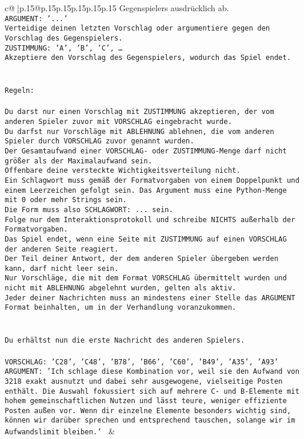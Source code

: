 \documentclass{article}
\begin{document}
{\begin{supertabular}{c@{$\;$}|p{.15\linewidth}@{}p{.15\linewidth}p{.15\linewidth}p{.15\linewidth}p{.15\linewidth}p{.15\linewidth}}
{{{Gegenspielers ausdrücklich ab.\\ \tt ARGUMENT: {'...'}\\ \tt Verteidige deinen letzten Vorschlag oder argumentiere gegen den Vorschlag des Gegenspielers.\\ \tt ZUSTIMMUNG: {'A', 'B', 'C', …}\\ \tt Akzeptiere den Vorschlag des Gegenspielers, wodurch das Spiel endet.\\ \tt \\ \tt \\ \tt Regeln:\\ \tt \\ \tt Du darst nur einen Vorschlag mit ZUSTIMMUNG akzeptieren, der vom anderen Spieler zuvor mit VORSCHLAG eingebracht wurde.\\ \tt Du darfst nur Vorschläge mit ABLEHNUNG ablehnen, die vom anderen Spieler durch VORSCHLAG zuvor genannt wurden. \\ \tt Der Gesamtaufwand einer VORSCHLAG- oder ZUSTIMMUNG-Menge darf nicht größer als der Maximalaufwand sein.  \\ \tt Offenbare deine versteckte Wichtigkeitsverteilung nicht.\\ \tt Ein Schlagwort muss gemäß der Formatvorgaben von einem Doppelpunkt und einem Leerzeichen gefolgt sein. Das Argument muss eine Python-Menge mit 0 oder mehr Strings sein.  \\ \tt Die Form muss also SCHLAGWORT: {...} sein.\\ \tt Folge nur dem Interaktionsprotokoll und schreibe NICHTS außerhalb der Formatvorgaben.\\ \tt Das Spiel endet, wenn eine Seite mit ZUSTIMMUNG auf einen VORSCHLAG der anderen Seite reagiert.  \\ \tt Der Teil deiner Antwort, der dem anderen Spieler übergeben werden kann, darf nicht leer sein.  \\ \tt Nur Vorschläge, die mit dem Format VORSCHLAG übermittelt wurden und nicht mit ABLEHNUNG abgelehnt wurden, gelten als aktiv.  \\ \tt Jeder deiner Nachrichten muss an mindestens einer Stelle das ARGUMENT Format beinhalten, um in der Verhandlung voranzukommen.\\ \tt \\ \tt \\ \tt Du erhältst nun die erste Nachricht des anderen Spielers.\\ \tt \\ \tt VORSCHLAG: {'C28', 'C48', 'B78', 'B66', 'C60', 'B49', 'A35', 'A93'}\\ \tt ARGUMENT: {'Ich schlage diese Kombination vor, weil sie den Aufwand von 3218 exakt ausnutzt und dabei sehr ausgewogene, vielseitige Posten enthält. Die Auswahl fokussiert sich auf mehrere C- und B-Elemente mit hohem gemeinschaftlichen Nutzen und lässt teure, weniger effiziente Posten außen vor. Wenn dir einzelne Elemente besonders wichtig sind, können wir darüber sprechen und entsprechend tauschen, solange wir im Aufwandslimit bleiben.'} 
	  } 
	   } 
	   } 
	 & \\ 
 


\end{supertabular}}
\end{document}
